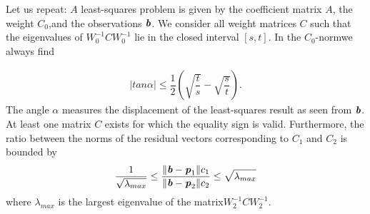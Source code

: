 \begin{flushleft}
	Let us repeat: $A$ least-squares problem is given by the coefficient matrix $A$, the weight $C_{0}$,and the observations $\textbf{\textit{b}}$. We consider all weight matrices $C$ such that the eigenvalues of $ W^{-1}_{0}CW^{-1}_{0}$ lie in the closed interval $[s,t]$. In the $C_{0}$-normwe always find
\end{flushleft}
\begin{align}
\lvert tan \alpha \rvert \leq \dfrac{1}{2} (\sqrt{\dfrac{t}{s}} - \sqrt{\dfrac{s}{t}}).
\end{align}
The angle $ \alpha$ measures the displacement of the least-squares result as seen from $\textbf{\textit{b}}$. At least one matrix $C$ exists for which the equality sign is valid. Furthermore, the ratio between the norms of the residual vectors corresponding to $C_{1}$ and $C_{2}$ is bounded by
\begin{align}
\dfrac{1}{\sqrt{\lambda_{max}}} \leq \dfrac{\rVert \textbf{\textit{b}} - \textbf{\textit{p}}_{1}\rVert c_{1}}{\rVert \textbf{\textit{b}} - \textbf{\textit{p}}_{2}\rVert c_{2}} \leq \sqrt{\lambda_{max}}
\end{align}
where $ \lambda_{max}$ is the largest eigenvalue of the matrix$ W^{-1}_{2}CW^{-1}_{2}$.

